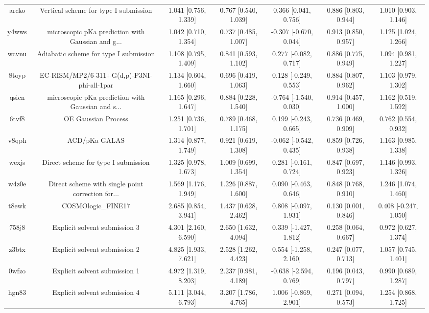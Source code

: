 \documentclass{article}
\begin{document}
\begin{center}
\begin{longtable}{|ccccccc|}
 arcko &              Vertical scheme for type I submission &  1.041 [0.756, 1.339] &  0.767 [0.540, 1.039] &     0.366 [0.041, 0.756] &  0.886 [0.803, 0.944] &   1.010 [0.903, 1.146] \\
 y4wws &  microscopic pKa prediction with Gaussian and g... &  1.042 [0.710, 1.354] &  0.737 [0.485, 1.007] &   -0.307 [-0.670, 0.044] &  0.913 [0.850, 0.957] &   1.125 [1.024, 1.266] \\
 wcvnu &             Adiabatic scheme for type I submission &  1.108 [0.795, 1.409] &  0.841 [0.593, 1.102] &    0.277 [-0.082, 0.717] &  0.886 [0.775, 0.949] &   1.094 [0.981, 1.227] \\
 8toyp &         EC-RISM/MP2/6-311+G(d,p)-P3NI-phi-all-1par &  1.134 [0.604, 1.660] &  0.696 [0.419, 1.063] &    0.128 [-0.249, 0.553] &  0.884 [0.807, 0.962] &   1.103 [0.979, 1.302] \\
 qsicn &  microscopic pKa prediction with Gaussian and s... &  1.165 [0.296, 1.647] &  0.884 [0.228, 1.540] &   -0.764 [-1.540, 0.030] &  0.914 [0.457, 1.000] &   1.162 [0.519, 1.592] \\
 6tvf8 &                                OE Gaussian Process &  1.251 [0.736, 1.701] &  0.789 [0.468, 1.175] &    0.199 [-0.243, 0.665] &  0.736 [0.469, 0.909] &   0.762 [0.554, 0.932] \\
 v8qph &                                      ACD/pKa GALAS &  1.314 [0.877, 1.749] &  0.921 [0.619, 1.308] &   -0.062 [-0.542, 0.435] &  0.859 [0.726, 0.938] &   1.163 [0.985, 1.338] \\
 wexjs &                Direct scheme for type I submission &  1.325 [0.978, 1.673] &  1.009 [0.699, 1.354] &    0.281 [-0.161, 0.724] &  0.847 [0.697, 0.923] &   1.146 [0.993, 1.326] \\
 w4z0e &  Direct scheme with single point correction for... &  1.569 [1.176, 1.949] &  1.226 [0.887, 1.600] &    0.090 [-0.463, 0.646] &  0.848 [0.768, 0.910] &   1.246 [1.074, 1.460] \\
 t8ewk &                                 COSMOlogic\_FINE17 &  2.685 [0.854, 3.941] &  1.437 [0.628, 2.462] &    0.808 [-0.097, 1.931] &  0.130 [0.001, 0.846] &  0.408 [-0.247, 1.050] \\
 758j8 &                      Explicit solvent submission 3 &  4.301 [2.160, 6.590] &  2.650 [1.632, 4.094] &    0.339 [-1.427, 1.812] &  0.258 [0.064, 0.667] &   0.972 [0.627, 1.374] \\
 z3btx &                      Explicit solvent submission 2 &  4.825 [1.933, 7.621] &  2.528 [1.262, 4.423] &    0.554 [-1.258, 2.160] &  0.247 [0.077, 0.713] &   1.057 [0.745, 1.401] \\
 0wfzo &                      Explicit solvent submission 1 &  4.972 [1.319, 8.203] &  2.237 [0.981, 4.189] &   -0.638 [-2.594, 0.769] &  0.196 [0.043, 0.797] &   0.990 [0.689, 1.287] \\
 hgn83 &                      Explicit solvent submission 4 &  5.111 [3.044, 6.793] &  3.207 [1.786, 4.765] &    1.006 [-0.869, 2.901] &  0.271 [0.094, 0.573] &   1.254 [0.868, 1.725] \\
\end{longtable}
\end{center}
\end{document}
